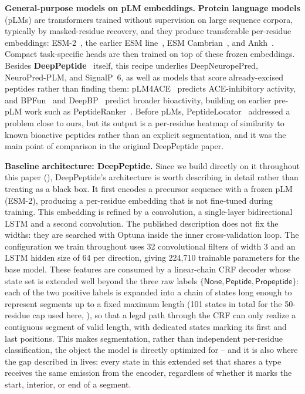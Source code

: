 \documentclass{article}
\begin{document}
\textbf{General-purpose models on pLM embeddings.} \textbf{Protein language models} (pLMs) are transformers trained without supervision on large sequence corpora, typically by masked-residue recovery, and they produce transferable per-residue embeddings: ESM-2~\citep{lin2023esm2}, the earlier ESM line~\citep{esm2_2019}, ESM Cambrian~\citep{esm_cambrian_blog_2024,ESM-family}, and Ankh~\citep{ankh2023}. Compact task-specific heads are then trained on top of these frozen embeddings. Besides \textbf{DeepPeptide}~\citep{deeppeptide2023} itself, this recipe underlies DeepNeuropePred, NeuroPred-PLM, and SignalP~6, as well as models that score already-excised peptides rather than finding them: pLM4ACE~\citep{du2024plm4ace} predicts ACE-inhibitory activity, and BPFun~\citep{bpfun2025} and DeepBP~\citep{zhang2024deepbp} predict broader bioactivity, building on earlier pre-pLM work such as PeptideRanker~\citep{mooney2012peptideranker}. Before pLMs, PeptideLocator~\citep{mooney2013peptidelocator} addressed a problem close to ours, but its output is a per-residue heatmap of similarity to known bioactive peptides rather than an explicit segmentation, and it was the main point of comparison in the original DeepPeptide paper.

\textbf{Baseline architecture: DeepPeptide.} Since we build directly on it throughout this paper (), DeepPeptide's architecture is worth describing in detail rather than treating as a black box. It first encodes a precursor sequence with a frozen pLM (ESM-2), producing a per-residue embedding that is not fine-tuned during training. This embedding is refined by a convolution, a single-layer bidirectional LSTM and a second convolution. The published description does not fix the widths: they are searched with Optuna inside the inner cross-validation loop. The configuration we train throughout uses 32 convolutional filters of width 3 and an LSTM hidden size of 64 per direction, giving 224{,}710 trainable parameters for the base model. These features are consumed by a linear-chain CRF decoder whose state set is extended well beyond the three raw labels $\{\textsf{None}, \textsf{Peptide}, \textsf{Propeptide}\}$: each of the two positive labels is expanded into a chain of states long enough to represent segments up to a fixed maximum length (101 states in total for the 50-residue cap used here, ), so that a legal path through the CRF can only realize a contiguous segment of valid length, with dedicated states marking its first and last positions. This makes segmentation, rather than independent per-residue classification, the object the model is directly optimized for -- and it is also where the gap described in  lives: every state in this extended set that shares a type receives the same emission from the encoder, regardless of whether it marks the start, interior, or end of a segment.
\end{document}
